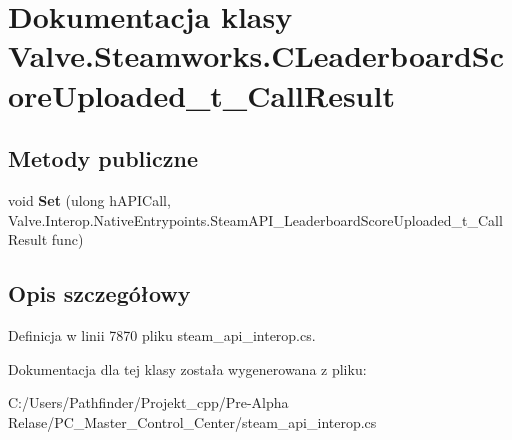 \hypertarget{class_valve_1_1_steamworks_1_1_c_leaderboard_score_uploaded__t___call_result}{}\section{Dokumentacja klasy Valve.\+Steamworks.\+C\+Leaderboard\+Score\+Uploaded\+\_\+t\+\_\+\+Call\+Result}
\label{class_valve_1_1_steamworks_1_1_c_leaderboard_score_uploaded__t___call_result}
\subsection*{Metody publiczne}
\begin{DoxyCompactItemize}
\item 
\mbox{\label{class_valve_1_1_steamworks_1_1_c_leaderboard_score_uploaded__t___call_result_afe784acada7f426879e96296c228e62a}} 
void {\bfseries Set} (ulong h\+A\+P\+I\+Call, Valve.\+Interop.\+Native\+Entrypoints.\+Steam\+A\+P\+I\+\_\+\+Leaderboard\+Score\+Uploaded\+\_\+t\+\_\+\+Call\+Result func)
\end{DoxyCompactItemize}


\subsection{Opis szczegółowy}


Definicja w linii 7870 pliku steam\+\_\+api\+\_\+interop.\+cs.



Dokumentacja dla tej klasy została wygenerowana z pliku\+:\begin{DoxyCompactItemize}
\item 
C\+:/\+Users/\+Pathfinder/\+Projekt\+\_\+cpp/\+Pre-\/\+Alpha Relase/\+P\+C\+\_\+\+Master\+\_\+\+Control\+\_\+\+Center/steam\+\_\+api\+\_\+interop.\+cs\end{DoxyCompactItemize}
